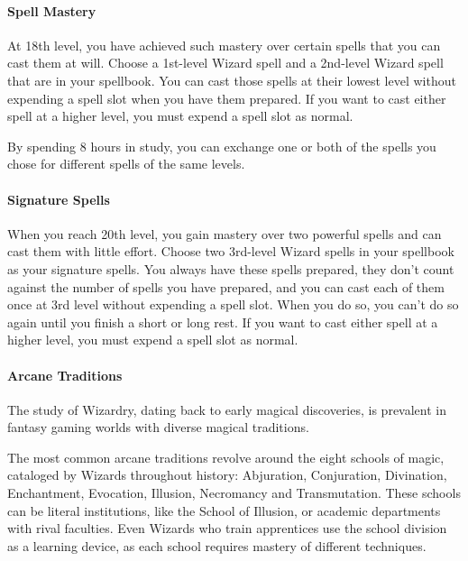 \paragraph{Spell Mastery}\label{wizard-feature-spell-mastery}

At 18th level, you have achieved such mastery over certain spells that
you can cast them at will. Choose a 1st-level Wizard spell and a
2nd-level Wizard spell that are in your spellbook. You can cast those
spells at their lowest level without expending a spell slot when you
have them prepared. If you want to cast either spell at a higher level,
you must expend a spell slot as normal.

By spending 8 hours in study, you can exchange one or both of the spells
you chose for different spells of the same levels.

\paragraph{Signature Spells}\label{wizard-feature-signature-spells}

When you reach 20th level, you gain mastery over two powerful spells and
can cast them with little effort. Choose two 3rd-level Wizard spells in
your spellbook as your signature spells. You always have these spells
prepared, they don't count against the number of spells you have
prepared, and you can cast each of them once at 3rd level without
expending a spell slot. When you do so, you can't do so again until you
finish a short or long rest. If you want to cast either spell at a
higher level, you must expend a spell slot as normal.

\paragraph{Arcane Traditions}\label{wizard-subclasses}

The study of Wizardry, dating back to early magical discoveries, is
prevalent in fantasy gaming worlds with diverse magical traditions.

The most common arcane traditions revolve around the eight schools of
magic, cataloged by Wizards throughout history: Abjuration, Conjuration,
Divination, Enchantment, Evocation, Illusion, Necromancy and
Transmutation. These schools can be literal institutions, like the
School of Illusion, or academic departments with rival faculties. Even
Wizards who train apprentices use the school division as a learning
device, as each school requires mastery of different techniques.


